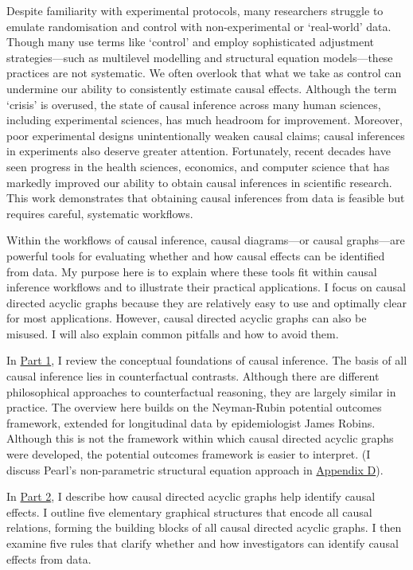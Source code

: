 \documentclass[
  single column]{article}
\begin{document}
Despite familiarity with experimental protocols, many researchers
struggle to emulate randomisation and control with non-experimental or
`real-world' data. Though many use terms like `control' and employ
sophisticated adjustment strategies---such as multilevel modelling and
structural equation models---these practices are not systematic. We
often overlook that what we take as control can undermine our ability to
consistently estimate causal effects. Although the term `crisis' is
overused, the state of causal inference across many human sciences,
including experimental sciences, has much headroom for improvement.
Moreover, poor experimental designs unintentionally weaken causal
claims; causal inferences in experiments also deserve greater attention.
Fortunately, recent decades have seen progress in the health sciences,
economics, and computer science that has markedly improved our ability
to obtain causal inferences in scientific research. This work
demonstrates that obtaining causal inferences from data is feasible but
requires careful, systematic workflows.

Within the workflows of causal inference, causal diagrams---or causal
graphs---are powerful tools for evaluating whether and how causal
effects can be identified from data. My purpose here is to explain where
these tools fit within causal inference workflows and to illustrate
their practical applications. I focus on causal directed acyclic graphs
because they are relatively easy to use and optimally clear for most
applications. However, causal directed acyclic graphs can also be
misused. I will also explain common pitfalls and how to avoid them.

In \hyperref[id-sec-1]{Part 1}, I review the conceptual foundations of
causal inference. The basis of all causal inference lies in
counterfactual contrasts. Although there are different philosophical
approaches to counterfactual reasoning, they are largely similar in
practice. The overview here builds on the Neyman-Rubin potential
outcomes framework, extended for longitudinal data by epidemiologist
James Robins. Although this is not the framework within which causal
directed acyclic graphs were developed, the potential outcomes framework
is easier to interpret. (I discuss Pearl's non-parametric structural
equation approach in \hyperref[id-app-d]{Appendix D}).

In \hyperref[id-sec-2]{Part 2}, I describe how causal directed acyclic
graphs help identify causal effects. I outline five elementary graphical
structures that encode all causal relations, forming the building blocks
of all causal directed acyclic graphs. I then examine five rules that
clarify whether and how investigators can identify causal effects from
data.
\end{document}
